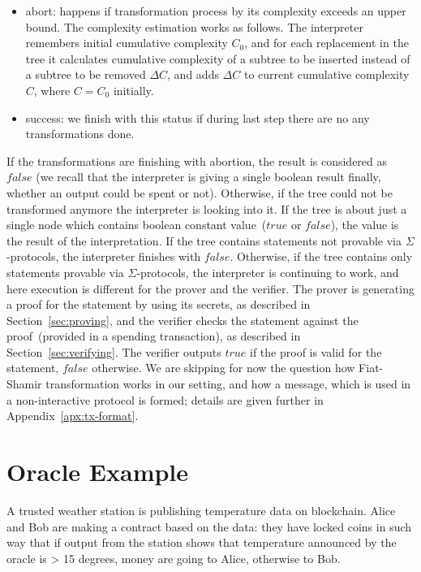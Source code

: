 \documentclass[11pt]{article}
\newcommand{\authnote}[2]{\marginpar{\parbox{\marginparwidth}{\tiny %
  \textsf{#1 {\textcolor{blue}{notes: #2}}}}}%
  \textcolor{blue}{\textbf{\dag}}}
\newcommand{\authnote}[2]{
  \textsf{#1 \textcolor{blue}{: #2}}}
\newcommand{\authnote}[2]{}
\newcommand{\knote}[1]{{\authnote{\textcolor{green}{kushti notes}}{#1}}}
\begin{document}
{\begin{itemize}
    \item{abort: } happens if transformation process by its complexity exceeds an upper bound. The complexity estimation works as follows. The interpreter remembers initial cumulative complexity $C_0$, and for each replacement in the tree it calculates cumulative complexity of a subtree to be inserted instead of a subtree to be removed $\Delta C$, and adds $\Delta C$ to current cumulative complexity $C$, where $C = C_0$ initially.
    \item{success: } we finish with this status if during last step there are no any transformations done.
\end{itemize}

If the transformations are finishing with abortion, the result is considered as $false$ (we recall that the interpreter is giving a single boolean result finally, whether an output could be spent or not). Otherwise, if the tree could not be transformed anymore the interpreter is looking into it. If the tree is about just a single node which contains boolean constant value~($true$ or $false$), the value is the result of the interpretation. If the tree contains statements not provable via $\Sigma$-protocols, the interpreter finishes with $false$. Otherwise, if the tree contains only statements provable via $\Sigma$-protocols, the interpreter is continuing to work, and here execution is different for the prover and the verifier. The prover is generating a proof for the statement by using its secrets, as described in Section~\ref{sec:proving}, and the verifier checks the statement against the proof~(provided in a spending transaction), as described in Section~\ref{sec:verifying}. The verifier outputs $true$ if the proof is valid for the statement, $false$ otherwise. We are skipping for now the question how Fiat-Shamir transformation works in our setting, and how a message, which is used in a non-interactive protocol is formed; details are given further in Appendix~\ref{apx:tx-format}.



\section{Oracle Example}

\knote{Text below is just copied from code comments, polish it}

A trusted weather station is publishing temperature data on blockchain. Alice and Bob are making a contract based on the data:
they have locked coins in such way that if output from the station shows that temperature announced by the oracle is > 15 degrees, money are going to Alice, otherwise to Bob.

}
\end{document}
